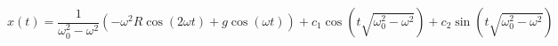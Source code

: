 \documentclass[letter, 10pts]{article}
\begin{document}
\[
x(t) = \frac{1}{\omega_0^2 - \omega^2} 
\left(
- \omega^2 R \cos ( 2 \omega t) + 
g \cos( \omega t)
\right) + 
c_1 \cos (t\sqrt{\omega_0^2 - \omega^2 } ) + 
c_2 \sin(t\sqrt{\omega_0^2 - \omega ^2} ) 
\]

\end{document}
